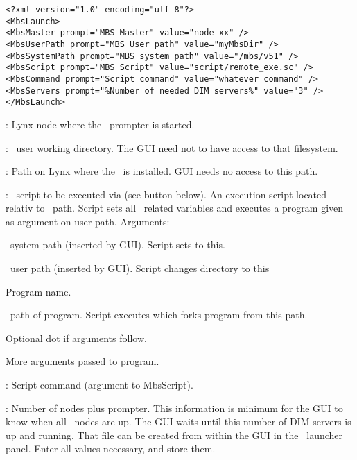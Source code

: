 {\small \begin{verbatim}
<?xml version="1.0" encoding="utf-8"?>
<MbsLaunch>
<MbsMaster prompt="MBS Master" value="node-xx" />
<MbsUserPath prompt="MBS User path" value="myMbsDir" />
<MbsSystemPath prompt="MBS system path" value="/mbs/v51" />
<MbsScript prompt="MBS Script" value="script/remote_exe.sc" />
<MbsCommand prompt="Script command" value="whatever command" />
<MbsServers prompt="%Number of needed DIM servers%" value="3" />
</MbsLaunch>
\end{verbatim}
\bdes
\item[MbsMaster]: Lynx node where the \mbs\ prompter is started.
\item[MbsUserPath]: \mbs\ user working directory. The GUI need not to have
access to that filesystem.
\item[MbsSystemPath]:  Path on Lynx where the \mbs\ is installed. GUI needs no access to this path.
\item[MbsScript]: \mbs\ script to be executed via  (see button below).
An execution script located relativ to \mbs\ path.
Script 
sets all \mbs\ related variables and executes a program given as argument
on user path. Arguments:
\bcir
\item \mbs\ system path (inserted by GUI). Script sets  to this.
\item \mbs\ user path (inserted by GUI). Script changes directory to this
\item Program name.
\item \mbs\ path of program. Script executes  which forks
program from this path.
\item Optional dot if arguments follow.
\item More arguments passed to program. 
\ecir
\item[MbsCommand]: Script command (argument to MbsScript).
\item[MbsServers]: Number of nodes plus prompter. This information
is minimum for the GUI to know when all \mbs\ nodes are up. The GUI waits until
this number of DIM servers is up and running.
\edes
That file can be created from within the GUI in the \mbs\ launcher panel.
Enter all values necessary, and store them. 
}
